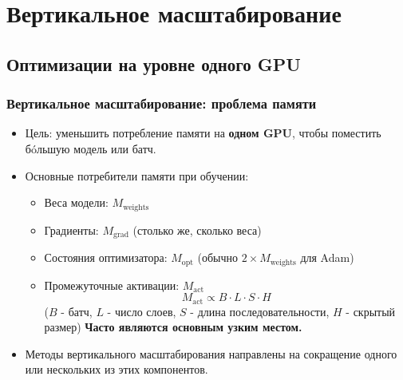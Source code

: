 
\section{Вертикальное масштабирование}

\subsection{Оптимизации на уровне одного GPU}

\begin{frame}
  \frametitle{Вертикальное масштабирование: проблема памяти}
  \begin{itemize}
    \item Цель: уменьшить потребление памяти на \textbf{одном GPU}, чтобы поместить бóльшую модель или батч.
    \item Основные потребители памяти при обучении:
      \begin{itemize}
        \item Веса модели: $M_{\text{weights}}$
        \item Градиенты: $M_{\text{grad}}$ (столько же, сколько веса)
        \item Состояния оптимизатора: $M_{\text{opt}}$ (обычно $2 \times M_{\text{weights}}$ для Adam)
        \item Промежуточные активации: $M_{\text{act}}$
          \[
            M_{\text{act}} \propto B \cdot L \cdot S \cdot H 
          \]
          ($B$ - батч, $L$ - число слоев, $S$ - длина последовательности, $H$ - скрытый размер)
          \textbf{Часто являются основным узким местом.}
      \end{itemize}
    \item Методы вертикального масштабирования направлены на сокращение одного или нескольких из этих компонентов.
  \end{itemize}
\end{frame}

